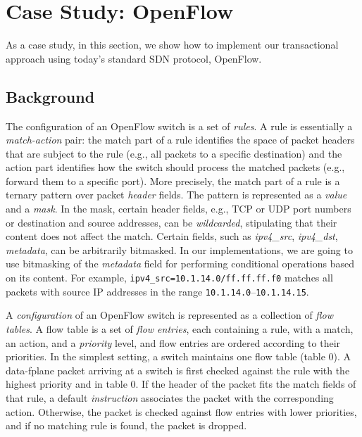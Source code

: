 \documentclass{sig-alternate-2006}
\newcommand{\liron}[1]{\textit{\textcolor{mypurple}{[liron]: #1}}} %
\newcommand{\petr}[1]{\textit{\textcolor{blue}{[petr]: #1}}} %
\begin{document}
\section{Case Study: OpenFlow}\label{sec:background}

As a case study, in this section, we show how to implement
our transactional approach using today's standard SDN protocol,
 OpenFlow. 

\subsection{Background}

The configuration of an OpenFlow switch is a set of
\emph{rules}.
A rule is essentially a \emph{match-action} pair:
the match part of a rule identifies the space of packet headers that are
subject to the rule (e.g., all packets to a specific destination) and
the action part identifies how the switch should process the matched
packets (e.g., forward them to a specific port).
More precisely, the match part of a rule is
a ternary pattern over packet \emph{header} fields.
The pattern is represented as a \emph{value} and a \emph{mask}.
In the mask, certain header fields, e.g., TCP or UDP port numbers or destination and source
addresses, can be \emph{wildcarded}, stipulating that their content does
not affect the match.
Certain fields, such as \emph{ipv4\_src}, \emph{ipv4\_dst}, \emph{metadata}, can be arbitrarily
bitmasked.
In our implementations, we are going to use bitmasking of the \emph{metadata}
field for performing conditional operations based on  its content.
For example, \texttt{ipv4\_src=10.1.14.0/ff.ff.ff.f0} matches all packets
with source IP addresses in the range \texttt{10.1.14.0}--\texttt{10.1.14.15}.

A \emph{configuration} of an OpenFlow switch is represented as a
collection of \emph{flow tables}.
A flow table is a set of \emph{flow entries}, each containing a rule,
with a match, an action, and a \emph{priority} level, and flow entries
are ordered according to their priorities.
In the simplest setting, a switch maintains one flow table (table 0).
A data-fplane packet arriving at a switch is first checked against
the rule with the highest priority and in table $0$.
If the header of the packet fits the match fields of that rule,
a default \emph{instruction} associates the packet with the corresponding action.
Otherwise, the packet is checked against flow  entries with lower
priorities, and if no matching rule is found, the packet is dropped.
\end{document}
